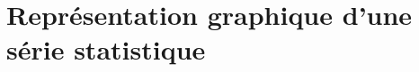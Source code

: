 \documentclass[10pt,a4paper,openany,twoside, eleve]{book}
\begin{document}







\section{Représentation graphique d'une série statistique}
\end{document}
